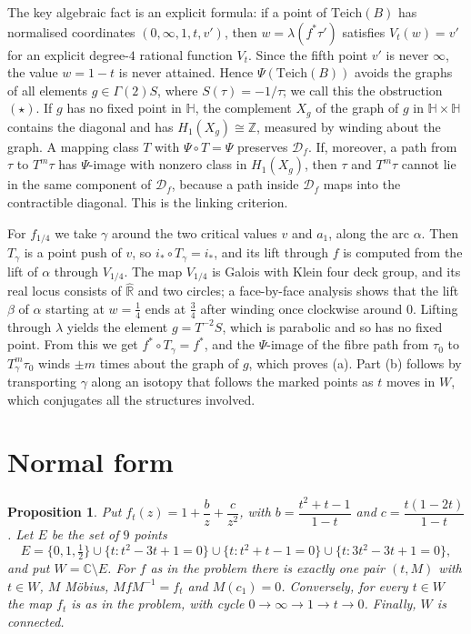\documentclass[11pt]{article}
\newtheorem{proposition}{Proposition}[section]
\theoremstyle{definition}
\newcommand{\Teich}{\mathrm{Teich}}
\newcommand{\Rh}{\hat{\mathbb R}}
\newcommand{\HH}{\mathbb H}
\newcommand{\D}{\mathcal D}
\begin{document}
The key algebraic fact is an explicit formula: if a point of $\Teich(B)$ has normalised coordinates $(0,\infty,1,t,v')$, then $w=\lambda(f^*\tau')$ satisfies $V_t(w)=v'$ for an explicit degree-$4$ rational function $V_t$. Since the fifth point $v'$ is never $\infty$, the value $w=1-t$ is never attained. Hence $\Psi(\Teich(B))$ avoids the graphs of all elements $g\in\Gamma(2)S$, where $S(\tau)=-1/\tau$; we call this the obstruction~$(\star)$. If $g$ has no fixed point in $\HH$, the complement $X_g$ of the graph of $g$ in $\HH\times\HH$ contains the diagonal and has $H_1(X_g)\cong\mathbb Z$, measured by winding about the graph. A mapping class $T$ with $\Psi\circ T=\Psi$ preserves $\D_f$. If, moreover, a path from $\tau$ to $T^m\tau$ has $\Psi$-image with nonzero class in $H_1(X_g)$, then $\tau$ and $T^m\tau$ cannot lie in the same component of $\D_f$, because a path inside $\D_f$ maps into the contractible diagonal. This is the linking criterion.

For $f_{1/4}$ we take $\gamma$ around the two critical values $v$ and $a_1$, along the arc $\alpha$. Then $T_\gamma$ is a point push of $v$, so $i_*\circ T_\gamma=i_*$, and its lift through $f$ is computed from the lift of $\alpha$ through $V_{1/4}$. The map $V_{1/4}$ is Galois with Klein four deck group, and its real locus consists of $\Rh$ and two circles; a face-by-face analysis shows that the lift $\beta$ of $\alpha$ starting at $w=\tfrac14$ ends at $\tfrac34$ after winding once clockwise around $0$. Lifting through $\lambda$ yields the element $g=T^{-2}S$, which is parabolic and so has no fixed point. From this we get $f^*\circ T_\gamma=f^*$, and the $\Psi$-image of the fibre path from $\tau_0$ to $T_\gamma^m\tau_0$ winds $\pm m$ times about the graph of $g$, which proves (a). Part (b) follows by transporting $\gamma$ along an isotopy that follows the marked points as $t$ moves in $W$, which conjugates all the structures involved.

\section{Normal form}\label{sec:normal}

\begin{proposition}\label{prop:normal}
Put $f_t(z)=1+\dfrac bz+\dfrac c{z^2}$, with $b=\dfrac{t^2+t-1}{1-t}$ and $c=\dfrac{t(1-2t)}{1-t}$. Let $E$ be the set of $9$ points
\[E=\{0,1,\tfrac12\}\cup\{t:t^2-3t+1=0\}\cup\{t:t^2+t-1=0\}\cup\{t:3t^2-3t+1=0\},\]
and put $W=\mathbb C\setminus E$. For $f$ as in the problem there is exactly one pair $(t,M)$ with $t\in W$, $M$ M\"obius, $MfM^{-1}=f_t$ and $M(c_1)=0$. Conversely, for every $t\in W$ the map $f_t$ is as in the problem, with cycle $0\to\infty\to1\to t\to0$. Finally, $W$ is connected.
\end{proposition}
\end{document}

